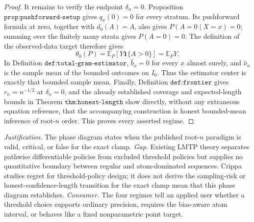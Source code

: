 \documentclass{article}
\begin{document}
\begin{proof}
It remains to verify the endpoint \(\delta_n=0\).  Proposition \(\texttt{prop:pushforward-setup}\) gives \(q_x(0)=0\) for every stratum.  Its pushforward formula at zero, together with \(d_0(A)=A\), also gives \(P(A=0\mid X=x)=0\); summing over the finitely many strata gives \(P(A=0)=0\).  The definition of the observed-data target therefore gives
\[
 \theta_0(P)=\mathbb E_P[Y\mathbf 1\{A>0\}]=\mathbb E_PY.
\]
In Definition \(\texttt{def:total-gram-estimator}\), \(\widehat b_x=0\) for every \(x\) almost surely, and \(\widehat\nu_n\) is the sample mean of the bounded outcomes on \(I_0\).  Thus the estimator center is exactly that bounded sample mean.  Finally, Definition \(\texttt{def:frontier}\) gives \(r_n=n^{-1/2}\) at \(\delta_n=0\), and the already established coverage and expected-length bounds in Theorem \(\texttt{thm:honest-length}\) show directly, without any extraneous equation reference, that the accompanying construction is honest bounded-mean inference of root-\(n\) order.  This proves every asserted regime.
\end{proof}
\par\smallskip\noindent \textit{Justification.} The phase diagram states when the published root-\(n\) paradigm is valid, critical, or false for the exact clamp. \textit{Gap.} Existing LMTP theory separates pathwise differentiable policies from excluded threshold policies but supplies no quantitative boundary between regular and atom-dominated sequences. Crippa studies regret for threshold-policy design; it does not derive the sampling-risk or honest-confidence-length transition for the exact clamp mean that this phase diagram establishes. \textit{Consumer.} The four regimes tell an applied user whether a threshold choice supports ordinary precision, requires the bias-aware atom interval, or behaves like a fixed nonparametric point target.
\end{document}
